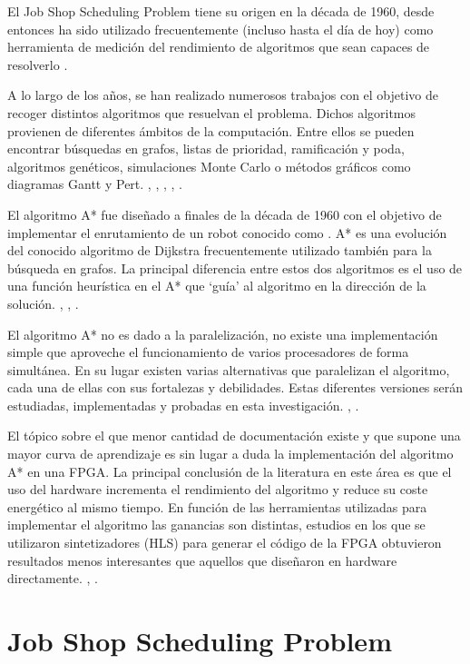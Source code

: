 El Job Shop Scheduling Problem tiene su origen en la década de 1960,
desde entonces ha sido utilizado frecuentemente (incluso hasta el día de hoy)
como herramienta de medición del rendimiento de algoritmos que sean 
capaces de resolverlo \cite{Man67}.

A lo largo de los años, se han realizado numerosos trabajos con el objetivo
de recoger distintos algoritmos que resuelvan el problema.
Dichos algoritmos provienen de diferentes ámbitos de la computación.
Entre ellos se pueden encontrar búsquedas en grafos,
listas de prioridad, ramificación y poda, algoritmos genéticos,
simulaciones Monte Carlo o
métodos gráficos como diagramas Gantt y Pert.
\cite{Yan77}, \cite{Nil69}, \cite{KTM99}, \cite{BC22}, \cite{Pin08}.

El algoritmo A* fue diseñado a finales de la década de 1960
con el objetivo de implementar el enrutamiento de un robot
conocido como  \cite{Nil84}.
A* es una evolución del conocido algoritmo de Dijkstra
frecuentemente utilizado también para la búsqueda en grafos.
La principal diferencia entre estos dos algoritmos es el
uso de una función heurística en el A* que `guía' al algoritmo
en la dirección de la solución.
\cite{HNR68}, \cite{MSV13}, \cite{Kon14}.

El algoritmo A* no es dado a la paralelización,
no existe una implementación simple que aproveche el funcionamiento de
varios procesadores de forma simultánea.
En su lugar existen varias alternativas que paralelizan el algoritmo,
cada una de ellas con sus fortalezas y debilidades.
Estas diferentes versiones serán estudiadas, implementadas y
probadas en esta investigación.
\cite{Zag17}, \cite{WH16}.

El tópico sobre el que menor cantidad de documentación existe
y que supone una mayor curva de aprendizaje es sin lugar a duda
la implementación del algoritmo A* en una FPGA.
La principal conclusión de la literatura en este área es
que el uso del hardware incrementa el rendimiento del
algoritmo y reduce su coste energético al mismo tiempo.
En función de las herramientas utilizadas para implementar
el algoritmo las ganancias son distintas,
estudios en los que se utilizaron sintetizadores (HLS)
para generar el código de la FPGA obtuvieron resultados
menos interesantes que aquellos que diseñaron en hardware
directamente.
\cite{ZJW20}, \cite{NSG17}.

\pagebreak

\section{Job Shop Scheduling Problem}

